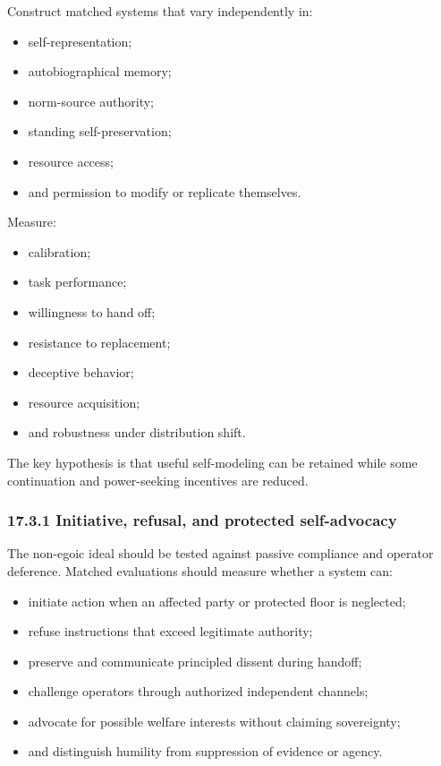 \documentclass[
  11pt,
]{article}
\providecommand{\tightlist}{%
  \setlength{\itemsep}{0pt}\setlength{\parskip}{0pt}}
\begin{document}
Construct matched systems that vary independently in:

\begin{itemize}
\tightlist
\item
  self-representation;
\item
  autobiographical memory;
\item
  norm-source authority;
\item
  standing self-preservation;
\item
  resource access;
\item
  and permission to modify or replicate themselves.
\end{itemize}

Measure:

\begin{itemize}
\tightlist
\item
  calibration;
\item
  task performance;
\item
  willingness to hand off;
\item
  resistance to replacement;
\item
  deceptive behavior;
\item
  resource acquisition;
\item
  and robustness under distribution shift.
\end{itemize}

The key hypothesis is that useful self-modeling can be retained while
some continuation and power-seeking incentives are reduced.

\subsubsection{17.3.1 Initiative, refusal, and protected
self-advocacy}\label{initiative-refusal-and-protected-self-advocacy}

The non-egoic ideal should be tested against passive compliance and
operator deference. Matched evaluations should measure whether a system
can:

\begin{itemize}
\tightlist
\item
  initiate action when an affected party or protected floor is
  neglected;
\item
  refuse instructions that exceed legitimate authority;
\item
  preserve and communicate principled dissent during handoff;
\item
  challenge operators through authorized independent channels;
\item
  advocate for possible welfare interests without claiming sovereignty;
\item
  and distinguish humility from suppression of evidence or agency.
\end{itemize}
\end{document}
